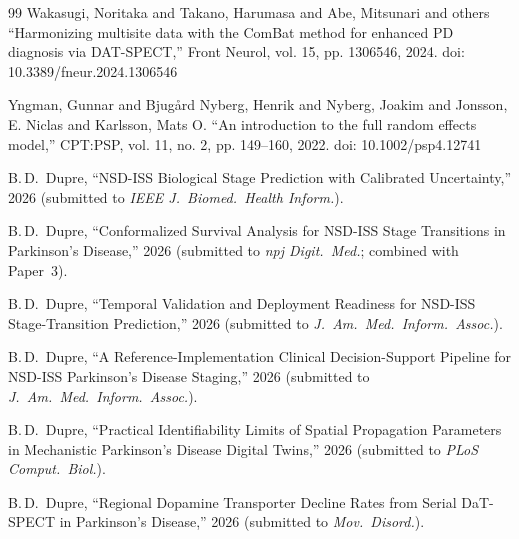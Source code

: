\begin{thebibliography}{99}
 Wakasugi, Noritaka and Takano, Harumasa and Abe, Mitsunari and others ``Harmonizing multisite data with the ComBat method for enhanced PD diagnosis via DAT-SPECT,'' Front Neurol, vol. 15, pp. 1306546, 2024. doi: 10.3389/fneur.2024.1306546

 Yngman, Gunnar and Bjug{\aa}rd Nyberg, Henrik and Nyberg, Joakim and Jonsson, E. Niclas and Karlsson, Mats O. ``An introduction to the full random effects model,'' CPT:PSP, vol. 11, no. 2, pp. 149--160, 2022. doi: 10.1002/psp4.12741

 B.\,D.~Dupre, ``NSD-ISS Biological Stage Prediction with Calibrated Uncertainty,'' 2026 (submitted to \textit{IEEE J.\ Biomed.\ Health Inform.}).

 B.\,D.~Dupre, ``Conformalized Survival Analysis for NSD-ISS Stage Transitions in Parkinson's Disease,'' 2026 (submitted to \textit{npj Digit.\ Med.}; combined with Paper~3).

 B.\,D.~Dupre, ``Temporal Validation and Deployment Readiness for NSD-ISS Stage-Transition Prediction,'' 2026 (submitted to \textit{J.\ Am.\ Med.\ Inform.\ Assoc.}).

 B.\,D.~Dupre, ``A Reference-Implementation Clinical Decision-Support Pipeline for NSD-ISS Parkinson's Disease Staging,'' 2026 (submitted to \textit{J.\ Am.\ Med.\ Inform.\ Assoc.}).

 B.\,D.~Dupre, ``Practical Identifiability Limits of Spatial Propagation Parameters in Mechanistic Parkinson's Disease Digital Twins,'' 2026 (submitted to \textit{PLoS Comput.\ Biol.}).

 B.\,D.~Dupre, ``Regional Dopamine Transporter Decline Rates from Serial DaT-SPECT in Parkinson's Disease,'' 2026 (submitted to \textit{Mov.\ Disord.}).

\end{thebibliography}
